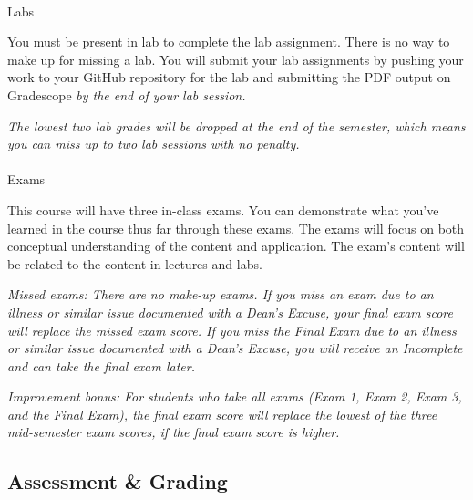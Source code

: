 \documentclass[
  letterpaper,
  DIV=11,
  numbers=noendperiod]{scrartcl}
\makeatletter
\let\oldparagraph\paragraph
\renewcommand{\paragraph}{
    \@ifstar
      \xxxParagraphStar
      \xxxParagraphNoStar
  }
\newcommand{\xxxParagraphStar}[1]{\oldparagraph*{#1}\mbox{}}
\newcommand{\xxxParagraphNoStar}[1]{\oldparagraph{#1}\mbox{}}
\makeatother
\begin{document}
\paragraph{Labs}\label{labs-1}

You must be present in lab to complete the lab assignment. There is no
way to make up for missing a lab. You will submit your lab assignments
by pushing your work to your GitHub repository for the lab and
submitting the PDF output on Gradescope \emph{by the end of your lab
session.}

\emph{The lowest two lab grades will be dropped at the end of the
semester, which means you can miss up to two lab sessions with no
penalty.}

\paragraph{Exams}\label{exams}

This course will have three in-class exams. You can demonstrate what
you've learned in the course thus far through these exams. The exams
will focus on both conceptual understanding of the content and
application. The exam's content will be related to the content in
lectures and labs.

\emph{Missed exams: There are no make-up exams. If you miss an exam due
to an illness or similar issue documented with a Dean's Excuse, your
final exam score will replace the missed exam score. If you miss the
Final Exam due to an illness or similar issue documented with a Dean's
Excuse, you will receive an Incomplete and can take the final exam
later.}

\emph{Improvement bonus: For students who take all exams (Exam 1, Exam
2, Exam 3, and the Final Exam), the final exam score will replace the
lowest of the three mid-semester exam scores, if the final exam score is
higher.}

\subsection{Assessment \& Grading}\label{assessment-grading-1}
\end{document}
